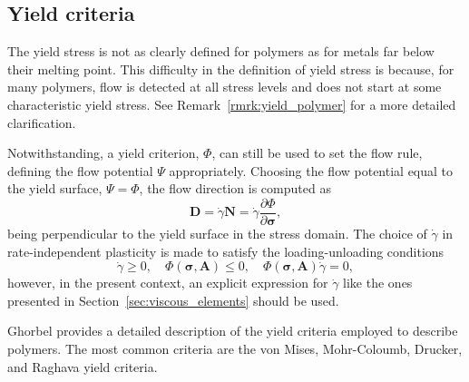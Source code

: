
\subsection{Yield criteria}
\label{sec:yield_criteria}

The yield stress is not as clearly defined for polymers as for metals far below their melting point.
This difficulty in the definition of yield stress is because, for many polymers, flow is detected at all stress levels and does not start at some characteristic yield stress.
See Remark~\ref{rmrk:yield_polymer} for a more detailed clarification.

Notwithstanding, a yield criterion, $\Phi$, can still be used to set the flow rule, defining the flow potential $\Psi$ appropriately.
Choosing the flow potential equal to the yield surface, $\Psi = \Phi$, the flow direction is computed as
\begin{equation}
	\bm D = \dot \gamma \bm N = \dot \gamma \frac{\partial \Phi}{\partial \bm \sigma},
\end{equation}
being perpendicular to the yield surface in the stress domain.
The choice of $\dot \gamma$ in rate-independent plasticity is made to satisfy the loading-unloading conditions
\begin{equation}
	\dot\gamma \geq 0,\quad \Phi(\bm \sigma, \bm A) \leq 0,\quad \Phi(\bm \sigma, \bm A) \dot \gamma = 0,
\end{equation}
however, in the present context, an explicit expression for $\dot \gamma$ like the ones presented in Section~\ref{sec:viscous_elements} should be used.

Ghorbel \citep{ghorbelViscoplasticConstitutiveModel2008} provides a detailed description of the yield criteria employed to describe polymers.
The most common criteria are the von Mises, Mohr-Coloumb, Drucker, and Raghava yield \citep{balieuNonassociatedViscoplasticityCoupled2014} criteria.

%


